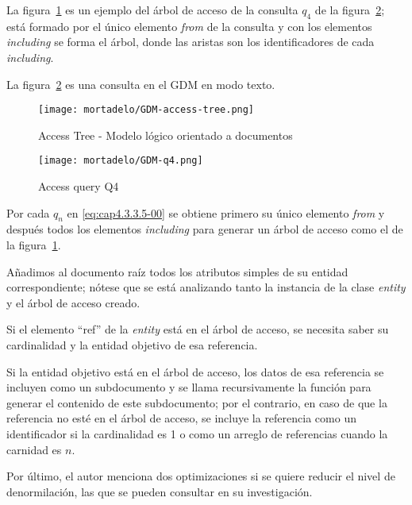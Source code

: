 La figura~\ref{img:mortadelo-gdm-logical-model-access-tree} es un ejemplo del árbol de acceso de la consulta $q_{4}$ de la figura~\ref{img:mortadelo-gdm-logical-model-q4}; está formado por el único elemento \textit{from} de la consulta y con los elementos \textit{including} se forma el árbol, donde las aristas son los identificadores de cada \textit{including}.


La figura~\ref{img:mortadelo-gdm-logical-model-q4} es una consulta en el GDM en modo texto.


\begin{figure}[H] 
    \centering
    \texttt{[image: mortadelo/GDM-access-tree.png]}
    \caption{Access Tree - Modelo lógico orientado a documentos}
    \label{img:mortadelo-gdm-logical-model-access-tree}
\end{figure}


\begin{figure}[H] 
    \centering
    \texttt{[image: mortadelo/GDM-q4.png]}
    \caption{Access query Q4}
    \label{img:mortadelo-gdm-logical-model-q4}
\end{figure}


Por cada $q_{n}$ en \eqref{eq:cap4.3.3.5-00} se obtiene primero su único elemento \textit{from} y después todos los elementos \textit{including} para generar un árbol de acceso como el de la figura~\ref{img:mortadelo-gdm-logical-model-access-tree}.


Añadimos al documento raíz todos los atributos simples de su entidad correspondiente; nótese que se está analizando tanto la instancia de la clase \textit{entity} y el árbol de acceso creado.


Si el elemento ``ref'' de la \textit{entity} está en el árbol de acceso, se necesita saber su cardinalidad y la entidad objetivo de esa referencia.


Si la entidad objetivo está en el árbol de acceso, los datos de esa referencia se incluyen como un subdocumento y se llama recursivamente la función para generar el contenido de este subdocumento; por el contrario, en caso de que la referencia no esté en el árbol de acceso, se incluye la referencia como un identificador si la cardinalidad es 1 o como un arreglo de referencias cuando la carnidad es $n$.


Por último, el autor menciona dos optimizaciones si se quiere reducir el nivel de denormilación, las que se pueden consultar en su investigación\cite{de_la_vega_mortadelo_2020}.

